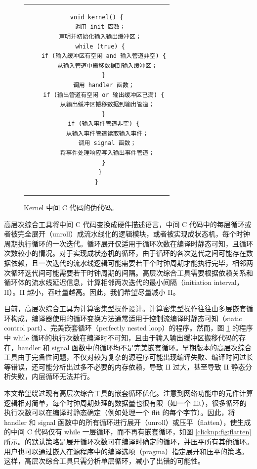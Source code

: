 \begin{figure}[htbp]
	\small
	\centering
	\begin{tabular}{c}
\begin{lstlisting}
void kernel() {
  调用 init 函数；
  声明并初始化输入输出缓冲区；
  while (true) {
    if (输入缓冲区有空闲 and 输入管道非空) {
      从输入管道中搬移数据到输入缓冲区；
    }
    调用 handler 函数；
    if (输出管道有空闲 or 输出缓冲区已满) {
      从输出缓冲区搬移数据到输出管道；
    }
    if (输入事件管道非空) {
      从输入事件管道读取输入事件；
      调用 signal 函数；
      将事件处理响应写入输出事件管道；
    }
  }
}
\end{lstlisting}
	\end{tabular}
	\caption{Kernel 中间 C 代码的伪代码。}
	\label{clicknp:fig:intermediate-c}
\end{figure}

高层次综合工具将中间 C 代码变换成硬件描述语言，中间 C 代码中的每层循环或者被完全展开（unroll）成流水线化的逻辑模块，或者被实现成状态机，每个时钟周期执行循环的一次迭代。循环展开仅适用于循环次数在编译时静态可知，且循环次数较小的情况。对于实现成状态机的循环，由于循环的各次迭代之间可能存在数据依赖，且一次迭代的流水线逻辑可能需要若干个时钟周期才能执行完毕，相邻两次循环迭代间可能需要若干时钟周期的间隔。高层次综合工具需要根据依赖关系和循环体的流水线延迟信息，计算相邻两次迭代的最小间隔（initiation interval，II）。II 越小，吞吐量越高。因此，我们希望尽量减小 II。

目前，高层次综合工具为计算密集型操作设计。计算密集型操作往往由多层嵌套循环构成，编译器使用的循环变换方法通常适用于控制流编译时静态可知（static control part）、完美嵌套循环（perfectly nested loop）的程序。然而，图 \ref{clicknp:fig:intermediate-c} 的程序中 while 循环的执行次数在编译时不可知，且由于输入输出缓冲区搬移代码的存在，handler 和 signal 函数中的循环均不是完美嵌套循环。早期版本的高层次综合工具由于完备性问题，不仅对较为复杂的源程序可能出现编译失败、编译时间过长等错误，还可能分析出过多不必要的内存依赖，导致 II 过大，甚至导致 II 静态分析失败，内层循环无法并行。

本文希望绕过现有高层次综合工具的嵌套循环优化。注意到网络功能中的元件计算逻辑相对简单，每个时钟周期处理的数据量也很有限（如一个 flit），很多循环的执行次数可以在编译时静态确定（例如处理一个 flit 的每个字节）。因此，\name 将 handler 和 signal 函数中的所有循环进行展开（unroll）或压平（flatten），使生成的中间 C 代码仅有 while 一层循环，而不再有嵌套循环，如图 \ref{clicknp:fig:flatten} 所示。\name 的默认策略是展开循环次数可在编译时确定的循环，并压平所有其他循环。用户也可以通过嵌入在源程序中的编译选项（pragma）指定展开和压平的策略。这样，高层次综合工具只需分析单层循环，减小了出错的可能性。

